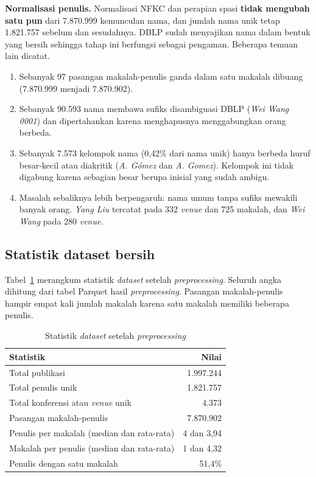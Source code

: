 \textbf{Normalisasi penulis.} Normalisasi NFKC dan perapian spasi \textbf{tidak mengubah satu pun} dari 7.870.999 kemunculan nama, dan jumlah nama unik tetap 1.821.757 sebelum dan sesudahnya. DBLP sudah menyajikan nama dalam bentuk yang bersih sehingga tahap ini berfungsi sebagai pengaman. Beberapa temuan lain dicatat.
\begin{enumerate}
\item Sebanyak 97 pasangan makalah-penulis ganda dalam satu makalah dibuang (7.870.999 menjadi 7.870.902).
\item Sebanyak 90.593 nama membawa sufiks disambiguasi DBLP (\textit{Wei Wang 0001}) dan dipertahankan karena menghapusnya menggabungkan orang berbeda.
\item Sebanyak 7.573 kelompok nama (0,42\% dari nama unik) hanya berbeda huruf besar-kecil atau diakritik (\textit{A. Gómez} dan \textit{A. Gomez}). Kelompok ini tidak digabung karena sebagian besar berupa inisial yang sudah ambigu.
\item Masalah sebaliknya lebih berpengaruh: nama umum tanpa sufiks mewakili banyak orang. \textit{Yang Liu} tercatat pada 332 \textit{venue} dan 725 makalah, dan \textit{Wei Wang} pada 280 \textit{venue}.
\end{enumerate}

\subsection{Statistik dataset bersih}
\label{sec:hasil-statistik}
Tabel~\ref{tab:statistik} merangkum statistik \textit{dataset} setelah \textit{preprocessing}. Seluruh angka dihitung dari tabel Parquet hasil \textit{preprocessing}. Pasangan makalah-penulis hampir empat kali jumlah makalah karena satu makalah memiliki beberapa penulis.

\begin{table}[ht]
\caption{Statistik \textit{dataset} setelah \textit{preprocessing}}
\label{tab:statistik}
\begin{tabular}{@{}lr@{}}
\toprule
\textbf{Statistik} & \textbf{Nilai} \\
\midrule
Total publikasi & 1.997.244 \\
Total penulis unik & 1.821.757 \\
Total konferensi atau \textit{venue} unik & 4.373 \\
Pasangan makalah-penulis & 7.870.902 \\
Penulis per makalah (median dan rata-rata) & 4 dan 3,94 \\
Makalah per penulis (median dan rata-rata) & 1 dan 4,32 \\
Penulis dengan satu makalah & 51,4\% \\
\bottomrule
\end{tabular}
\end{table}


